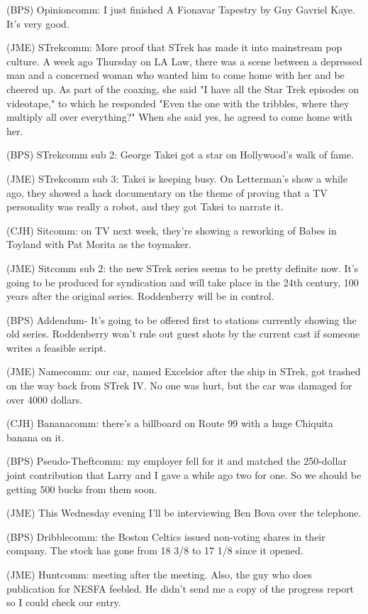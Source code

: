 \documentclass[12pt]{article}
\begin{document}
(BPS) Opinioncomm: I just finished A Fionavar Tapestry by Guy Gavriel Kaye. It's very good.

(JME) STrekcomm: More proof that STrek has made it into mainstream pop culture. A week ago Thursday on LA Law, there was a scene between a depressed man and a concerned woman who wanted him to come home with her and be cheered up. As part of the coaxing, she said "I have all the Star Trek episodes on videotape," to which he responded "Even the one with the tribbles, where they multiply all over everything?" When she said yes, he agreed to come home with her.

(BPS) STrekcomm sub 2: George Takei got a star on Hollywood's walk of fame.

(JME) STrekcomm sub 3: Takei is keeping busy. On Letterman's show a while ago, they showed a hack documentary on the theme of proving that a TV personality was really a robot, and they got Takei to narrate it.

(CJH) Sitcomm: on TV next week, they're showing a reworking of Babes in Toyland with Pat Morita as the toymaker.

(JME) Sitcomm sub 2: the new STrek series seems to be pretty definite now. It's going to be produced for syndication and will take place in the 24th century, 100 years after the original series. Roddenberry will be in control.

(BPS) Addendum- It's going to be offered first to stations currently showing the old series. Roddenberry won't rule out guest shots by the current cast if someone writes a feasible script.

(JME) Namecomm: our car, named Excelsior after the ship in STrek, got trashed on the way back from STrek IV. No one was hurt, but the car was damaged for over 4000 dollars.

(CJH) Bananacomm: there's a billboard on Route 99 with a huge Chiquita banana on it.

(BPS) Pseudo-Theftcomm: my employer fell for it and matched the 250-dollar joint contribution that Larry and I gave a while ago two for one. So we should be getting 500 bucks from them soon.

(JME) This Wednesday evening I'll be interviewing Ben Bova over the telephone.

(BPS) Dribblecomm: the Boston Celtics issued non-voting shares in their company. The stock has gone from 18 3/8 to 17 1/8 since it opened.

(JME) Huntcomm: meeting after the meeting. Also, the guy who does publication for NESFA feebled. He didn't send me a copy of the progress report so I could check our entry.
\end{document}
